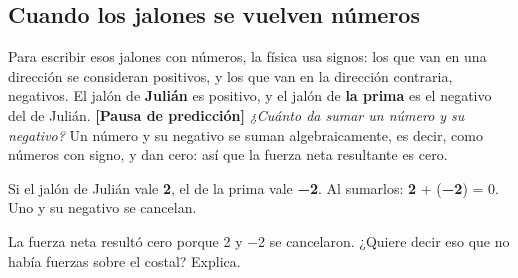 \documentclass[
  spanish,
  letterpaper,
  12pt,
  oneside,
  open=any,
  DIV=15]{scrbook}
\begin{document}
\subsection{Cuando los jalones se vuelven
números}\label{cuando-los-jalones-se-vuelven-nuxfameros}

Para escribir esos jalones con números, la física usa signos: los que
van en una dirección se consideran positivos, y los que van en la
dirección contraria, negativos. El jalón de
\textcolor[HTML]{7C3AED}{\textbf{Julián}} es positivo, y el jalón de
\textcolor[HTML]{2563EB}{\textbf{la prima}} es el negativo del de
Julián. \textbf{{[}Pausa de predicción{]}} \emph{¿Cuánto da sumar un
número y su negativo?} Un número y su negativo se suman algebraicamente,
es decir, como números con signo, y dan cero: así que la fuerza neta
resultante es cero.

\begin{tcolorbox}[enhanced jigsaw, arc=.35mm, bottomrule=.15mm, bottomtitle=1mm, breakable, colback=white, colbacktitle=quarto-callout-note-color!10!white, colframe=quarto-callout-note-color-frame, coltitle=black, left=2mm, leftrule=.75mm, opacityback=0, opacitybacktitle=0.6, rightrule=.15mm, title=\textcolor{quarto-callout-note-color}{\faInfo}\hspace{0.5em}{Apoyo Visual}, titlerule=0mm, toprule=.15mm, toptitle=1mm]

Si el jalón de Julián vale \textcolor[HTML]{7C3AED}{\textbf{2}}, el de
la prima vale \textcolor[HTML]{2563EB}{\textbf{−2}}. Al sumarlos:
\textcolor[HTML]{7C3AED}{\textbf{2}} +
(\textcolor[HTML]{2563EB}{\textbf{−2}}) = 0. Uno y su negativo se
cancelan.

\end{tcolorbox}

\begin{tcolorbox}[enhanced jigsaw, arc=.35mm, bottomrule=.15mm, bottomtitle=1mm, breakable, colback=white, colbacktitle=quarto-callout-warning-color!10!white, colframe=quarto-callout-warning-color-frame, coltitle=black, left=2mm, leftrule=.75mm, opacityback=0, opacitybacktitle=0.6, rightrule=.15mm, title=\textcolor{quarto-callout-warning-color}{\faExclamationTriangle}\hspace{0.5em}{Pregunta de comprensión}, titlerule=0mm, toprule=.15mm, toptitle=1mm]

La fuerza neta resultó cero porque 2 y −2 se cancelaron. ¿Quiere decir
eso que no había fuerzas sobre el costal? Explica.

\end{tcolorbox}
\end{document}

